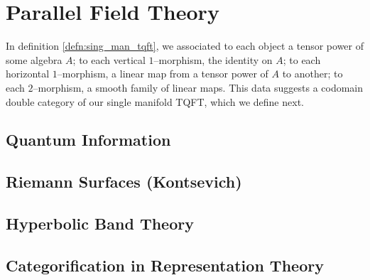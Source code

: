 \documentclass[\PRJWD/Thick_TQFTs_and_Quantum_Information.tex]{subfiles}
\begin{document}
\section{Parallel Field Theory}

In definition \ref{defn:sing_man_tqft}, we associated to each object a tensor
power of some algebra $A$; to each vertical $1$--morphism, the identity on $A$;
to each horizontal $1$--morphism, a linear map from a tensor power of $A$ to
another; to each $2$--morphism, a smooth family of linear maps. This data
suggests a codomain double category of our single manifold TQFT, which we define
next.







\subsection{Quantum Information}

\subsection{Riemann Surfaces (Kontsevich)}

\subsection{Hyperbolic Band Theory}

\subsection{Categorification in Representation Theory}
\end{document}
